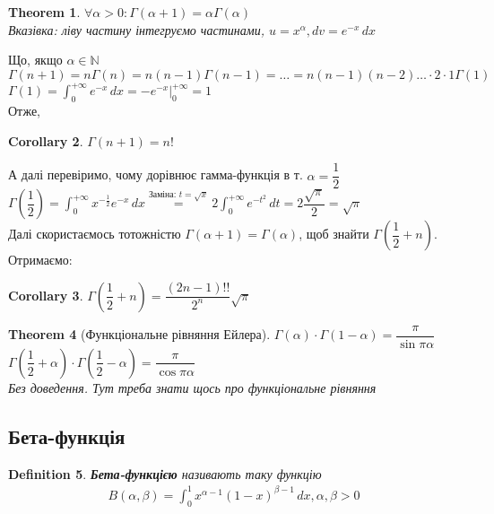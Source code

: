 \documentclass[a4paper, 14pt]{extarticle}
\def\huge{\displaystyle}
\theoremstyle{theoremdd}
\newtheorem{theorem}{Theorem}[subsection]
\theoremstyle{theoremdd}
\newtheorem{definition}[theorem]{Definition}
\theoremstyle{theoremdd}
\theoremstyle{theoremdd}
\theoremstyle{theoremdd}
\newtheorem{corollary}[theorem]{Corollary}
\theoremstyle{theoremdd}
\theoremstyle{theoremdd}
\begin{document}
\begin{theorem}
$\forall \alpha > 0: \Gamma (\alpha+1) = \alpha \Gamma (\alpha)$\\
\textit{Вказівка: ліву частину інтегруємо частинами}, $u = x^{\alpha}, dv = e^{-x}\,dx$
\end{theorem}
Що, якщо $\alpha \in \mathbb{N}$\\
$\Gamma(n+1) = n \Gamma (n) = n(n-1) \Gamma (n-1) = \dots = n(n-1)(n-2)\dots \cdot 2 \cdot 1 \Gamma (1)$\\
$\Gamma(1) = \huge \int_0^{+\infty} e^{-x}\,dx = -e^{-x} \Big|_{0}^{+\infty} = 1$\\
Отже,
\begin{corollary}
$\Gamma(n+1) = n!$
\end{corollary}
А далі перевіримо, чому дорівнює гамма-функція в т. $\alpha = \dfrac{1}{2}$\\
$\Gamma \left( \dfrac{1}{2} \right) = \huge \int_0^{+\infty} x^{-\frac{1}{2}}e^{-x}\,dx \overset{\textrm{Заміна: } t = \sqrt{x}}{=} 2 \huge \int_0^{+\infty} e^{-t^2}\,dt = 2 \dfrac{\sqrt{\pi}}{2} = \sqrt{\pi}$\\
Далі скористаємось тотожністю $\Gamma(\alpha+1) = \Gamma(\alpha)$, щоб знайти $\Gamma \left( \dfrac{1}{2} + n \right)$. Отримаємо:
\begin{corollary}
$\Gamma \left( \dfrac{1}{2} + n \right) = \dfrac{(2n-1)!!}{2^n} \sqrt{\pi}$
\end{corollary}

\begin{theorem}[Функціональне рівняння Ейлера]
$\Gamma(\alpha) \cdot \Gamma(1-\alpha) = \dfrac{\pi}{\sin \pi \alpha}$\\
$\Gamma \left(\dfrac{1}{2} + \alpha \right) \cdot \Gamma \left(\dfrac{1}{2}-\alpha \right) = \dfrac{\pi}{\cos \pi \alpha}$\\
\textit{Без доведення. Тут треба знати щось про функціональне рівняння}
\end{theorem}

\subsection{Бета-функція}
\begin{definition}
\textbf{Бета-функцією} називають таку функцію
\begin{align*}
B(\alpha,\beta) = \int_0^1 x^{\alpha-1} (1-x)^{\beta-1}\,dx, \alpha,\beta>0
\end{align*}
\end{definition}
\end{document}
